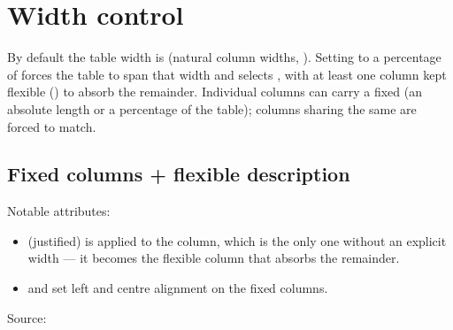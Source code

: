 \documentclass[a4paper,twoside]{article}
\begin{document}
\section{Width control}
By default the table width is  (natural column widths, ).
Setting  to a percentage of  forces the table to
span that width and selects , with at least one column kept
flexible () to absorb the remainder. Individual columns can carry a fixed
 (an absolute length or a percentage of the table); columns sharing
the same  are forced to match.
\subsection{Fixed columns + flexible description}
Notable attributes:
\begin{itemize}
\item {} (justified) is applied to the  column, which is
the only one without an explicit width --- it becomes the flexible 
column that absorbs the remainder.
\item {} and  set left and centre alignment on the fixed
columns.
\end{itemize}
Source:
\end{document}
